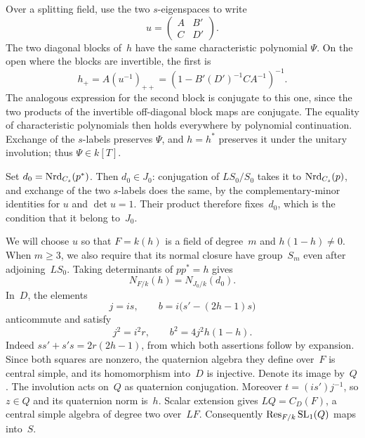 Over a splitting field, use the two $s$-eigenspaces to write
\[
 u=\begin{pmatrix}A&B'\\ C&D'\end{pmatrix}.
\]
The two diagonal blocks of~$h$ have the same characteristic polynomial
$\Psi$.  On the open where the blocks are invertible, the first is
\begin{equation}\label{eq:unitary-compression}
 h_+=A(u^{-1})_{++}
     =(1-B'(D')^{-1}CA^{-1})^{-1}.
\end{equation}
The analogous expression for the second block is conjugate to this
one, since the two products of the invertible off-diagonal block
maps are conjugate.  The equality of characteristic polynomials then
holds everywhere by polynomial continuation.  Exchange of the
$s$-labels preserves $\Psi$, and $h=h^*$ preserves it under the
unitary involution; thus $\Psi\in k[T]$.

Set $d_0=\operatorname{Nrd}_{C_s}(p^*)$.  Then $d_0\in J_0$: conjugation of
$LS_0/S_0$ takes it to $\operatorname{Nrd}_{C_s}(p)$, and exchange of the two
$s$-labels does the same, by the complementary-minor identities for
$u$ and $\det u=1$.  Their product therefore fixes~$d_0$, which is the
condition that it belong to~$J_0$.

We will choose $u$ so that $F=k(h)$ is a field of degree~$m$ and
$h(1-h)\ne0$.  When $m\geq3$, we also require that its normal closure
have group~$S_m$ even after adjoining~$LS_0$.  Taking determinants of
$pp^*=h$ gives
\begin{equation}\label{eq:unitary-norm-compatibility}
 N_{F/k}(h)=N_{J_0/k}(d_0).
\end{equation}
In~$D$, the elements
\[
 j=is,\qquad b=i\bigl(s'-(2h-1)s\bigr)
\]
anticommute and satisfy
\begin{equation}\label{eq:unitary-quaternion}
 j^2=i^2r,\qquad b^2=4j^2h(1-h).
\end{equation}
Indeed $ss'+s's=2r(2h-1)$, from which both assertions follow by
expansion.  Since both squares are nonzero, the quaternion algebra
they define over~$F$ is central simple, and its homomorphism into~$D$
is injective.  Denote its image by~$Q$.  The involution acts on~$Q$ as
quaternion conjugation.  Moreover $t=(is')j^{-1}$, so $z\in Q$ and
its quaternion norm is~$h$.  Scalar extension gives
$LQ=C_D(F)$, a central simple algebra of degree two over~$LF$.
Consequently $\operatorname{Res}_{F/k}\operatorname{SL}_1(Q)$ maps into~$S$.

